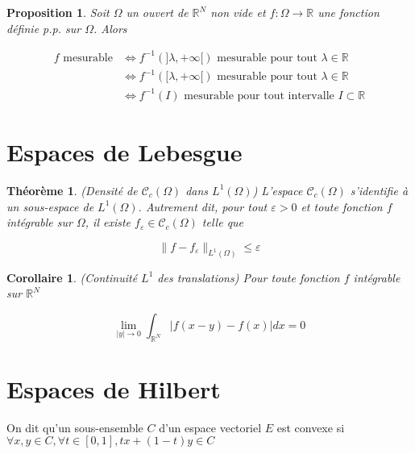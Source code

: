 \documentclass[10pt,a4paper,oneside]{article}
\newtheorem{theoreme}{Théorème}
\newtheorem{proposition}{Proposition}
\newtheorem{corollaire}{Corollaire}
\newenvironment{definition}[1][Definition]{\begin{trivlist}
\item[\hskip \labelsep {\bfseries #1}]}{\end{trivlist}}
\begin{document}
\begin{proposition}
Soit $\Omega$ un ouvert de $\mathbb{R}^N$ non vide et $f : \Omega \to \mathbb{R}$ une fonction définie p.p. sur $\Omega$. Alors

\begin{align*}
f\text{ mesurable} &\Leftrightarrow f^{-1}(]\lambda,+\infty[) \text{ mesurable pour tout } \lambda \in \mathbb{R}\\
&\Leftrightarrow f^{-1}([\lambda,+\infty[) \text{ mesurable pour tout } \lambda \in \mathbb{R}\\
&\Leftrightarrow f^{-1}(I) \text{ mesurable pour tout intervalle } I \subset \mathbb{R}
\end{align*}

\end{proposition}

\section{Espaces de Lebesgue}

\begin{theoreme}
(Densité de $\mathcal{C}_c(\Omega)$ dans $L^1(\Omega)$)
L'espace $\mathcal{C}_c(\Omega)$ s'identifie à un sous-espace de $L^1(\Omega)$. Autrement dit, pour tout $\varepsilon > 0$ et toute fonction $f$ intégrable sur $\Omega$, il existe $f_\varepsilon \in \mathcal{C}_c(\Omega)$ telle que

\[ \| f - f_\varepsilon \|_{L^1(\Omega)} \leq \varepsilon \]
\end{theoreme}

\begin{corollaire}
(Continuité $L^1$ des translations)
Pour toute fonction $f$ intégrable sur $\mathbb{R}^N$

\[ \lim_{|y| \to 0} \int_{\mathbb{R}^N} |f(x - y) - f(x)| dx = 0 \]
\end{corollaire}

\section{Espaces de Hilbert}

\begin{definition}
On dit qu'un sous-ensemble $C$ d'un espace vectoriel $E$ est convexe si
$\forall x,y \in C, \forall t \in [0,1], tx + (1 - t)y \in C$
\end{definition}
\end{document}
